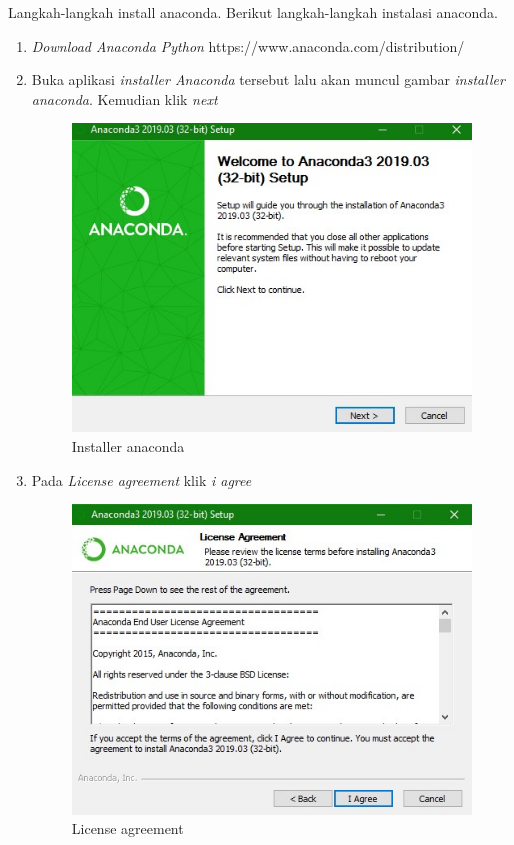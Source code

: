 Langkah-langkah install anaconda.
Berikut langkah-langkah instalasi anaconda.
\begin{enumerate}
\item \textit{Download Anaconda Python} https://www.anaconda.com/distribution/
\item Buka aplikasi \textit{installer Anaconda} tersebut lalu akan muncul  gambar \textit{installer anaconda}. Kemudian klik \textit{next}
\begin{figure}[H]
        \centerline{\includegraphics[scale=0.5]{figures/b}}
        \caption{Installer anaconda}
		\label{langkah1}
\end{figure}

\item Pada \textit{License agreement} klik \textit{i agree}
\begin{figure}[H]
        \centerline{\includegraphics[scale=0.5]{figures/c}}
        \caption{License agreement}
		\label{langkah2}
\end{figure}



\end{enumerate}
